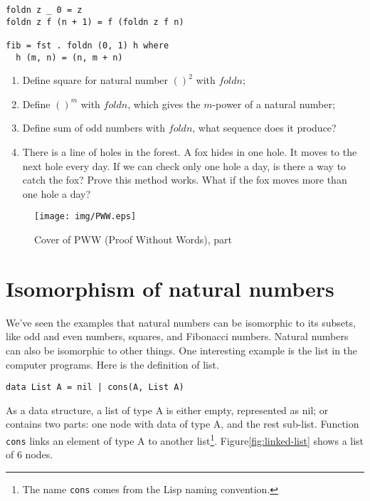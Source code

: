 \documentclass[UTF8]{article}
\begin{document}
\lstset{frame=single}
\begin{lstlisting}
foldn z _ 0 = z
foldn z f (n + 1) = f (foldn z f n)

fib = fst . foldn (0, 1) h where
  h (m, n) = (n, m + n)
\end{lstlisting}

\begin{Exercise}
\begin{enumerate}
\item Define square for natural number $()^2$ with $foldn$;
\item Define $()^m$ with $foldn$, which gives the $m$-power of a natural number;
\item Define sum of odd numbers with $foldn$, what sequence does it produce?
\item There is a line of holes in the forest. A fox hides in one hole. It moves to the next hole every day. If we can check only one hole a day, is there a way to catch the fox? Prove this method works. What if the fox moves more than one hole a day\cite{Gusen2014}?
\end{enumerate}
\end{Exercise}

\begin{figure}[htbp]
 \centering
 \texttt{[image: img/PWW.eps]}
 \caption{Cover of PWW (Proof Without Words), part}
 \label{fig:PWW}
\end{figure}

\section{Isomorphism of natural numbers}

We've seen the examples that natural numbers can be isomorphic to its subsets, like odd and even numbers, squares, and Fibonacci numbers. Natural numbers can also be isomorphic to other things. One interesting example is the list in the computer programs. Here is the definition of list.

\lstset{frame=none}
\begin{lstlisting}
data List A = nil | cons(A, List A)
\end{lstlisting}

As a data structure, a list of type A is either empty, represented as nil; or contains two parts: one node with data of type A, and the rest sub-list. Function \texttt{cons} links an element of type A to another list\footnote{The name \texttt{cons} comes from the Lisp naming convention.}. Figure\ref{fig:linked-list} shows a list of 6 nodes.
\end{document}
